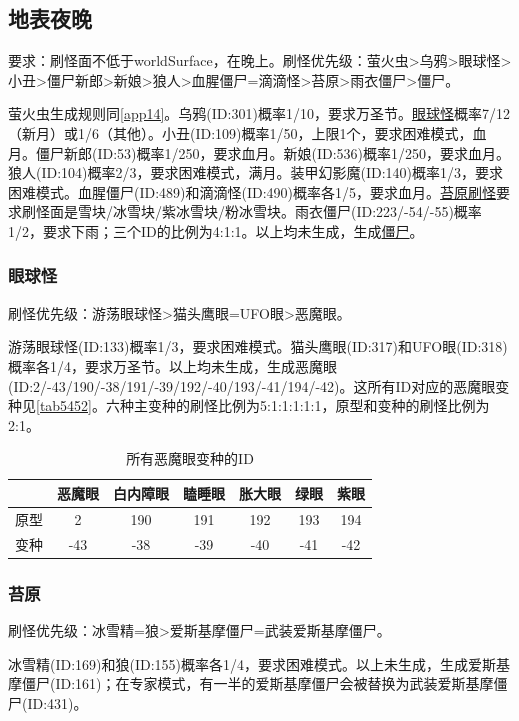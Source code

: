 \subsection{地表夜晚}
要求：刷怪面不低于worldSurface，在晚上。刷怪优先级：萤火虫>乌鸦>眼球怪>小丑>僵尸新郎>新娘>狼人>血腥僵尸=滴滴怪>苔原>雨衣僵尸>僵尸。

萤火虫生成规则同\autoref{app14}。乌鸦(ID:301)概率1/10，要求万圣节。\hyperref[app15]{眼球怪}概率7/12（新月）或1/6（其他）。小丑(ID:109)概率1/50，上限1个，要求困难模式，血月。僵尸新郎(ID:53)概率1/250，要求血月。新娘(ID:536)概率1/250，要求血月。狼人(ID:104)概率2/3，要求困难模式，满月。装甲幻影魔(ID:140)概率1/3，要求困难模式。血腥僵尸(ID:489)和滴滴怪(ID:490)概率各1/5，要求血月。\hyperref[app16]{苔原刷怪}要求刷怪面是雪块/冰雪块/紫冰雪块/粉冰雪块。雨衣僵尸(ID:223/-54/-55)概率1/2，要求下雨；三个ID的比例为4:1:1。以上均未生成，生成\hyperref[app17]{僵尸}。

\subsubsection{眼球怪}\label{app15}
刷怪优先级：游荡眼球怪>猫头鹰眼=UFO眼>恶魔眼。

游荡眼球怪(ID:133)概率1/3，要求困难模式。猫头鹰眼(ID:317)和UFO眼(ID:318)概率各1/4，要求万圣节。以上均未生成，生成恶魔眼(ID:2/-43/190/-38/191/-39/192/-40/193/-41/194/-42)。这所有ID对应的恶魔眼变种见\autoref{tab5452}。六种主变种的刷怪比例为5:1:1:1:1:1，原型和变种的刷怪比例为2:1。

\begin{table}[!h]
    \centering
    \begin{tabular}{c|cccccc}
         &恶魔眼&白内障眼&瞌睡眼&胀大眼&绿眼&紫眼\\\hline
         原型&2&190&191&192&193&194\\
         变种&-43&-38&-39&-40&-41&-42
    \end{tabular}
    \caption{所有恶魔眼变种的ID}
    \label{tab5452}
\end{table}

\subsubsection{苔原}\label{app16}
刷怪优先级：冰雪精=狼>爱斯基摩僵尸=武装爱斯基摩僵尸。

冰雪精(ID:169)和狼(ID:155)概率各1/4，要求困难模式。以上未生成，生成爱斯基摩僵尸(ID:161)；在专家模式，有一半的爱斯基摩僵尸会被替换为武装爱斯基摩僵尸(ID:431)。

